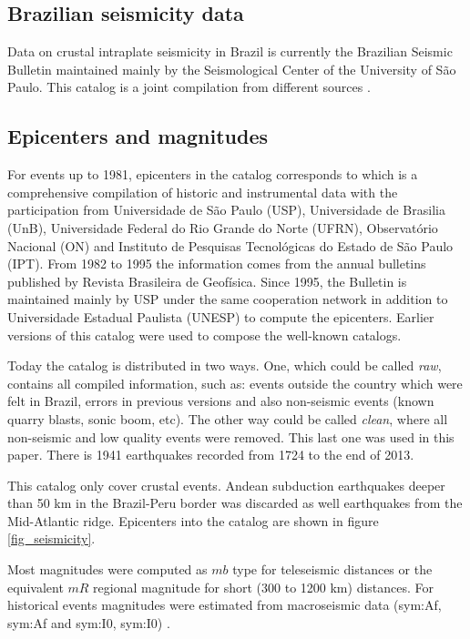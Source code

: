 \documentclass[draft, grl]{agutex}
\begin{document}
\begin{article}
%
%

\section{Brazilian seismicity data}

Data on crustal intraplate seismicity in Brazil is currently the Brazilian Seismic Bulletin maintained mainly by the Seismological Center of the University of São Paulo. This catalog is a joint compilation from different sources \citep{bsb_2014}.


\subsection{Epicenters and magnitudes}

For events up to 1981, epicenters in the catalog corresponds to \citet{berrocal_1984} which is a comprehensive compilation of historic and instrumental data with the participation from Universidade de São Paulo (USP), Universidade de Brasilia (UnB), Universidade Federal do Rio Grande do Norte (UFRN), Observatório Nacional (ON) and Instituto de Pesquisas Tecnológicas do Estado de São Paulo (IPT). From 1982 to 1995 the information comes from the annual bulletins published by Revista Brasileira de Geofísica. Since 1995, the Bulletin is maintained mainly by USP under the same cooperation network in addition to Universidade Estadual Paulista (UNESP) to compute the epicenters. Earlier versions of this catalog were used to compose the well-known \citet{ceresis_1985, ceresis_1995} catalogs.

Today the catalog is distributed in two ways. One, which could be called \emph{raw}, contains all compiled information, such as: events outside the country which were felt in Brazil, errors in previous versions and also non-seismic events (known quarry blasts, sonic boom, etc). The other way could be called \emph{clean}, where all non-seismic and low quality events were removed. This last one was used in this paper. There is 1941 earthquakes recorded from 1724 to the end of 2013.

This catalog only cover crustal events. Andean subduction earthquakes deeper than 50 km in the Brazil-Peru border was discarded as well earthquakes from the Mid-Atlantic ridge. Epicenters into the catalog are shown in figure \ref{fig_seismicity}.


Most magnitudes were computed as $mb$ type for teleseismic distances or the equivalent $mR$ \citep{assumpcao_1983} regional magnitude for short (300 to 1200 km) distances. For historical events magnitudes were estimated from macroseismic data (\glsdesc{sym:Af}, \gls{sym:Af} and \glsdesc{sym:I0}, \gls{sym:I0}) \citep{berrocal_1984}. 


\end{article}
\end{document}
